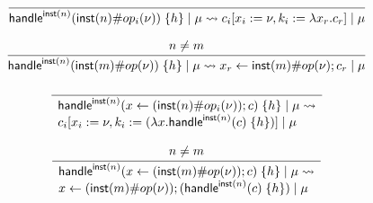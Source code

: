 \[\frac{
	\begin{array}{l}
	\end{array}
}{
	\mathsf{handle}^{\mathsf{inst}(n)} ( \mathsf{inst}(n) \# op_i(\nu) ) \; \{h\} \; | \; \mu \rightsquigarrow c_i[x_i := \nu, k_i := \lambda x_r . c_r] \; | \; \mu
}\]

\[\frac{
	\begin{array}{l}
	n \neq m
	\end{array}
}{
	\mathsf{handle}^{\mathsf{inst}(n)} ( \mathsf{inst}(m) \# op(\nu) ) \; \{h\} \; | \; \mu \rightsquigarrow x_r \leftarrow \mathsf{inst}(m) \# op(\nu) ; c_r \; | \; \mu
}\]

\[\frac{
	\begin{array}{l}
	\end{array}
}{
	\begin{array}{l}
	\mathsf{handle}^{\mathsf{inst}(n)} ( x \leftarrow (\mathsf{inst}(n) \# op_i(\nu)) ; c ) \; \{h\} \; | \; \mu \rightsquigarrow \\
	c_i[x_i := \nu, k_i := (\lambda x . \mathsf{handle}^{\mathsf{inst}(n)} ( c ) \; \{h\})] \; | \; \mu
	\end{array}
}\]

\[\frac{
	\begin{array}{l}
	n \neq m
	\end{array}
}{
	\begin{array}{l}
	\mathsf{handle}^{\mathsf{inst}(n)} ( x \leftarrow (\mathsf{inst}(m) \# op(\nu)) ; c ) \; \{h\} \; | \; \mu \rightsquigarrow \\
	x \leftarrow (\mathsf{inst}(m) \# op(\nu)) ; (\mathsf{handle}^{\mathsf{inst}(n)} ( c ) \; \{h\}) \; | \; \mu
	\end{array}
}\]
